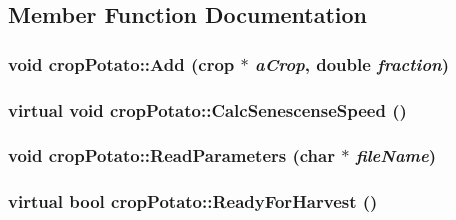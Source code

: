 \subsection{Member Function Documentation}
\hypertarget{classcrop_potato_a30a6b30efbf7c829443065659af4c6e3}{
\subsubsection[{Add}]{\setlength{\rightskip}{0pt plus 5cm}void cropPotato::Add ({\bf crop} $\ast$ {\em aCrop}, \/  double {\em fraction})}}
\label{classcrop_potato_a30a6b30efbf7c829443065659af4c6e3}
\hypertarget{classcrop_potato_a5614feb2626d863c49f724b3b74dbd68}{
\subsubsection[{CalcSenescenseSpeed}]{\setlength{\rightskip}{0pt plus 5cm}virtual void cropPotato::CalcSenescenseSpeed ()}}
\label{classcrop_potato_a5614feb2626d863c49f724b3b74dbd68}
\hypertarget{classcrop_potato_a627a0b8cc554dfe44a2ec6576828267a}{
\subsubsection[{ReadParameters}]{\setlength{\rightskip}{0pt plus 5cm}void cropPotato::ReadParameters (char $\ast$ {\em fileName})}}
\label{classcrop_potato_a627a0b8cc554dfe44a2ec6576828267a}
\hypertarget{classcrop_potato_ac3aabdce7024004252aec7b0c150ddf3}{
\subsubsection[{ReadyForHarvest}]{\setlength{\rightskip}{0pt plus 5cm}virtual bool cropPotato::ReadyForHarvest ()}}
\label{classcrop_potato_ac3aabdce7024004252aec7b0c150ddf3}


